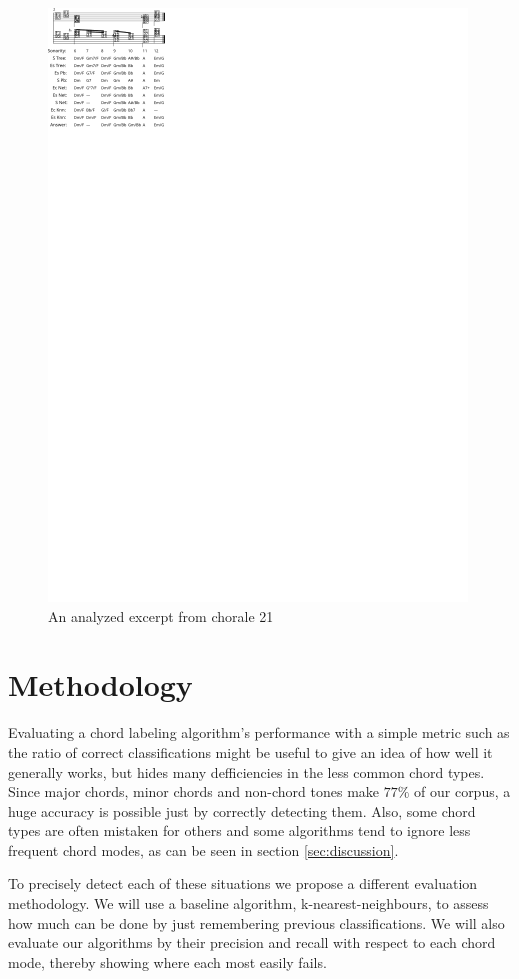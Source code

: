 \documentclass{article}
\begin{document}
\begin{figure}
  \centering
  \includegraphics[scale=4]{coral-021}
  \caption{An analyzed excerpt from chorale 21}
  \label{fig:coral-021}
\end{figure}


\section{Methodology}
\label{sec:methodology}

Evaluating a chord labeling algorithm's performance with a simple
metric such as the ratio of correct classifications might be useful to
give an idea of how well it generally works, but hides many
defficiencies in the less common chord types. Since major chords,
minor chords and non-chord tones make $77\%$ of our corpus, a huge
accuracy is possible just by correctly detecting them. Also, some
chord types are often mistaken for others and some algorithms tend to
ignore less frequent chord modes, as can be seen in section
\ref{sec:discussion}.

To precisely detect each of these situations we propose a different
evaluation methodology. We will use a baseline algorithm,
k-nearest-neighbours, to assess how much can be done by just
remembering previous classifications. We will also evaluate our
algorithms by their precision and recall with respect to each chord
mode, thereby showing where each most easily fails. 
\end{document}
